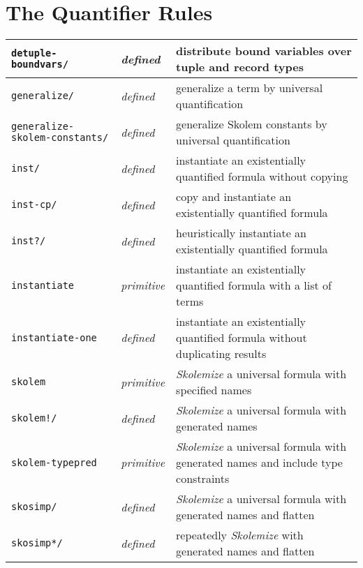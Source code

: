 \documentclass[12pt]{book}
\makeatletter
\newcommand{\indtt}[1]{\texttt{#1}\index{#1@{\texttt{#1}}}}  %
\newcommand{\indttdol}[1]{\texttt{#1/\char36}\index{#1@{\texttt{#1}}}} %
\newcommand{\indskobang}{\index{skolem"!@{\texttt{skolem"!}}}}
\newcommand{\skobangdol}{\texttt{skolem!/\char36}\indskobang}
\makeatother
\begin{document}

\section{The Quantifier Rules}

\begin{tabularx}{\textwidth}{|l|l|X|}\hline
\indttdol{detuple-boundvars} & \emph{defined}
  & distribute bound variables over tuple and record types \\\hline
\indttdol{generalize} & \emph{defined}
  & generalize a term by universal quantification \\\hline
\indttdol{generalize-skolem-constants} & \emph{defined}
  & generalize Skolem constants by universal quantification\\\hline
\indttdol{inst} & \emph{defined}
  & instantiate an existentially quantified formula without copying \\\hline
\indttdol{inst-cp} & \emph{defined}
  & copy and instantiate an existentially quantified formula \\\hline
\indttdol{inst?} & \emph{defined}
  & heuristically instantiate an existentially quantified formula \\\hline
\indtt{instantiate} & \emph{primitive}
  & instantiate an existentially quantified formula with a list of terms \\\hline
\indtt{instantiate-one} & \emph{defined}
  & instantiate an existentially quantified formula without duplicating results \\\hline
\indtt{skolem} & \emph{primitive}
  & \emph{Skolemize} a universal formula with specified names\\\hline
\skobangdol & \emph{defined}
  & \emph{Skolemize} a universal formula with generated names \\\hline
\indtt{skolem-typepred} & \emph{primitive}
  & \emph{Skolemize} a universal formula with generated names and include type constraints\\\hline
\indttdol{skosimp} & \emph{defined}
  & \emph{Skolemize} a universal formula with generated names and flatten \\\hline
\indttdol{skosimp*} & \emph{defined}
  & repeatedly \emph{Skolemize} with generated names and flatten \\\hline
\end{tabularx}
\end{document}
